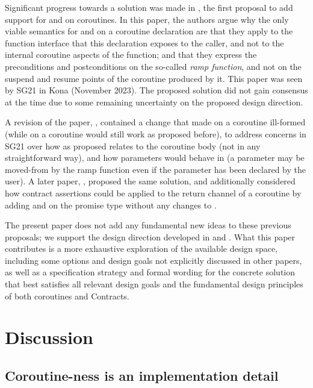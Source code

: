 Significant progress towards a solution was made in \cite{P2957R0},  the first proposal to add support for  and  on coroutines. In this paper, the authors argue why the only viable semantics for  and  on a coroutine declaration are that they apply to the function interface that this declaration exposes to the caller, and not to the internal coroutine aspects of the function; and that they express the preconditions and postconditions on the so-called \emph{ramp function}, and not on the suspend and resume points of the coroutine produced by it. This paper was seen by SG21 in Kona (November 2023). The proposed solution did not gain consensus at the time due to some remaining uncertainty on the proposed design direction. 

A revision of the paper, \cite{P2957R1}, contained a change that made  on a coroutine ill-formed (while  on a coroutine would still work as proposed before), to address concerns in SG21 over how  as proposed relates to the coroutine body (not in any straightforward way), and how parameters would behave in  (a parameter may be moved-from by the ramp function even if the parameter has been declared  by the user). A later paper, \cite{P3251R0}, proposed the same solution, and additionally considered how contract assertions could be applied to the return channel of a coroutine by adding  and  on the promise type without any changes to \cite{P2900R8}.

The present paper does not add any fundamental new ideas to these previous proposals; we support the design direction developed in \cite{P2957R0} and \cite{P2957R1}. What this paper contributes is a more exhaustive exploration of the available design space, including some options and design goals not explicitly discussed in other papers, as well as a specification strategy and formal wording for the concrete solution that best satisfies all relevant design goals and the fundamental design principles of both coroutines and Contracts.

\section{Discussion}

\subsection{Coroutine-ness is an implementation detail}
\label{impldetail}


